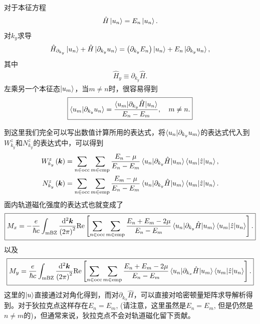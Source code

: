 \documentclass[10pt, oneside]{article}
\newcommand{\mr}[1]{\mathrm{#1}}
\begin{document}
对于本征方程
\begin{align}
	\hat{H} \ket{u_n} = E_{n } \ket{u_n}.
\end{align}
对\(k_y\)求导
\begin{align}
	\hat{H }_{\partial_{k_{y}}} \ket{u_{n }} + \hat{H } \ket{\partial_{k_{y}} u_n} = \left(\partial_{k_{y}} E_{n }\right) \ket{u_n} + E_n \ket{\partial_{k_{y}} u_n},
\end{align}
其中
\begin{align}
	\hat{H}_{y} \equiv \partial_{k_{y}} \hat{H}. 
\end{align}
左乘另一个本征态\(\ket{u_{m }}\)，当\(m \neq n  \)时，很容易得到
\begin{align}
	\boxed{
		\braket{u_{m } | \partial_{k_{y}} u_{n }} = \frac{\braket{u_{m } | \partial_{k_{y}} \hat{H} | u_{n }}}{E_{n } - E_{m }}, \quad m \neq n.
	}
\end{align}

到这里我们完全可以写出数值计算所用的表达式，将\(\braket{u_{n } | \partial_{k_{y}} u_{m }}\)的表达式代入到\(W^{z}_{k_{y}}\)和\(N^{z}_{k_{y}}\)的表达式中，可以得到
\begin{align}
	\begin{split}
		W^{z}_{k_{y}} \left(\bm{k }\right) & = \sum_{n \in \mathrm{occ}}\sum_{ m \in \mathrm{emp}} \frac{E_{n } - \mu}{E_{n } - E_{m }} \braket{u_n | \partial_{k_{y}} \hat{H} | u_m} \braket{u_{m } | \hat{z} | u_{n }} ,\\
		N^{z}_{k_{y}} \left(\bm{k }\right) & = \sum_{n \in \mathrm{occ}}\sum_{m \in \mathrm{emp}} \frac{E_{m } - \mu}{E_{n } - E_{m }} \braket{u_n | \partial_{k_{y}} \hat{H} | u_m} \braket{u_{m } | \hat{z} | u_{n }}.
	\end{split}
\end{align}
面内轨道磁化强度的表达式也就变成了
\begin{align}
	\boxed{
		M_{x} = - \frac{e}{\hbar c} \int_{\mathrm{mBZ }} \frac{\mathrm{d}^{2} \bm{k} }{ \left(2 \pi\right)^{2}} \mr{Re} \left[\sum_{n \in \mathrm{occ}}\sum_{m \in \mathrm{emp}} \frac{ E_{n} + E_{m } - 2\mu}{E_{n } - E_{m }} \braket{u_n | \partial_{k_{y}} \hat{H} | u_m} \braket{u_{m } | \hat{z} | u_{n }}\right].
	}
\end{align}
以及
\begin{align}
	\boxed{
		M_{y} =  \frac{e}{\hbar c}  \int_{\mathrm{mBZ }} \frac{\mathrm{d}^{2} \bm{k} }{ \left(2 \pi\right)^{2}}  \mr{Re} \left[\sum_{n \in \mathrm{occ}}\sum_{m \in \mathrm{emp}} \frac{ E_{n} + E_{m } -2 \mu}{E_{n } - E_{m }} \braket{u_n | \partial_{k_{x}} \hat{H} | u_m} \braket{u_{m } | \hat{z} | u_{n }}\right].
	}
\end{align}
这里的\(\ket{u}\)直接通过对角化得到，而对\(\partial_{k_{\alpha}} \hat{H}\)，可以直接对哈密顿量矩阵求导解析得到。对于狄拉克点这样存在\(E_{n } = E_{m}\), (请注意，这里虽然是\(E_{n } = E_{m }\), 但是仍然是\(n \neq m \)的)，但通常来说，狄拉克点不会对轨道磁化留下贡献。
\end{document}
